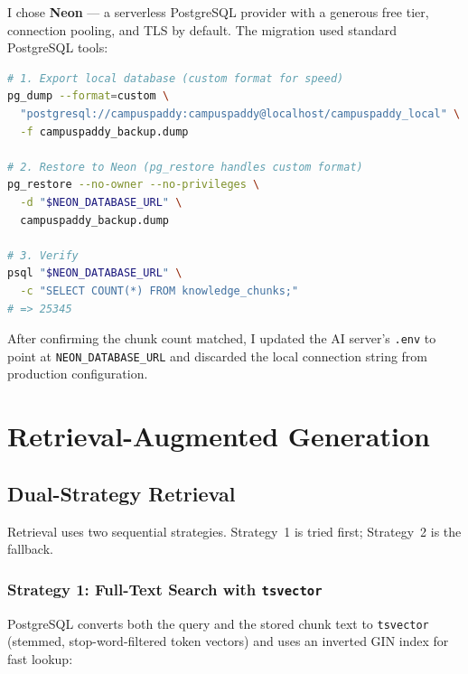 \documentclass[12pt,a4paper]{report}
\begin{document}
I chose \textbf{Neon} --- a serverless PostgreSQL provider with a generous free tier, connection pooling, and TLS by default. The migration used standard PostgreSQL tools:

\begin{lstlisting}[language=bash, caption=One-shot migration from local PostgreSQL to Neon]
# 1. Export local database (custom format for speed)
pg_dump --format=custom \
  "postgresql://campuspaddy:campuspaddy@localhost/campuspaddy_local" \
  -f campuspaddy_backup.dump

# 2. Restore to Neon (pg_restore handles custom format)
pg_restore --no-owner --no-privileges \
  -d "$NEON_DATABASE_URL" \
  campuspaddy_backup.dump

# 3. Verify
psql "$NEON_DATABASE_URL" \
  -c "SELECT COUNT(*) FROM knowledge_chunks;"
# => 25345
\end{lstlisting}

After confirming the chunk count matched, I updated the AI server's \texttt{.env} to point at \texttt{NEON\_DATABASE\_URL} and discarded the local connection string from production configuration.

\chapter{Retrieval-Augmented Generation}

\section{Dual-Strategy Retrieval}

Retrieval uses two sequential strategies. Strategy~1 is tried first; Strategy~2 is the fallback.

\subsection{Strategy 1: Full-Text Search with \texttt{tsvector}}

PostgreSQL converts both the query and the stored chunk text to \texttt{tsvector} (stemmed, stop-word-filtered token vectors) and uses an inverted GIN index for fast lookup:
\end{document}
